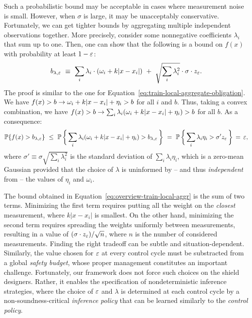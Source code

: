 \documentclass[acmsmall,screen,nonacm]{acmart}
\begin{document}
\newcommand{\OverviewAggBound}{b_{\lambda, \Eps}}

Such a probabilistic bound may be acceptable in cases where measurement noise is small. However, when $\sigma$ is large, it may be unacceptably conservative. Fortunately, we can get tighter bounds by aggregating multiple independent observations together. More precisely, consider some nonnegative coefficients $\lambda_i$ that sum up to one. Then, one can show that the following is a bound on $f(x)$ with probability at least $1 - \varepsilon$:
\begin{equation}\label{eq:overview-train-local-aggr}
  \OverviewAggBound \ \equiv \ \sum_i \lambda_i \cdot (\omega_i + k|x-x_i|) \ + \ \sqrt{\sum_i \lambda_i^2} \cdot \sigma \cdot z_\Eps.
\end{equation}
The proof is similar to the one for Equation~\ref{eq:train-local-aggregate-obligation}. We have $f(x) > b \rightarrow \omega_i + k|x-x_i| + \eta_i > b$ for all $i$ and $b$. Thus, taking a convex combination, we have $f(x) > b \rightarrow \sum_i \lambda_i (\omega_i + k|x-x_i| + \eta_i) > b$ for all $b$. As a consequence:
\begin{equation}\label{eq:overview-train-local-aggr-proof}
  \Prob\{f(x) > \OverviewAggBound \} \ \le\  \Prob\,\biggl\{  \,\sum_i \lambda_i (\omega_i + k|x-x_i| + \eta_i) > \OverviewAggBound \, \biggr\} \ = \  \Prob\,\biggl\{ \,\sum_i \lambda_i\eta_i > \sigma' z_\Eps\, \biggr\} \,=\, \Eps,
\end{equation}
where $\sigma' \!\equiv\! \sigma \sqrt{\sum_i \lambda_i^2}$ is the standard deviation of $\sum_i \lambda_i \eta_i$, which is a zero-mean Gaussian provided that the choice of $\lambda$ is uninformed by -- and thus \emph{independent} from -- the values of $\eta_i$ and $\omega_i$.

The bound obtained in Equation~\ref{eq:overview-train-local-aggr} is the sum of two terms. Minimizing the first term requires putting all the weight on the \emph{closest} measurement, where $k|x-x_i|$ is smallest. On the other hand, minimizing the second term requires spreading the weights uniformly between measurements, resulting in a value of $(\sigma \cdot z_\varepsilon) / \sqrt{n}$, where $n$ is the number of considered measurements. Finding the right tradeoff can be subtle and situation-dependent. Similarly, the value chosen for $\varepsilon$ at every control cycle must be substracted from a global \emph{safety budget}, whose proper management constitutes an important challenge. Fortunately, our framework does not force such choices on the shield designers. Rather, it enables the specification of nondeterministic inference strategies, where the choice of $\varepsilon$ and $\lambda$ is determined at each control cycle by a non-soundness-critical \emph{inference policy} that can be learned similarly to the \emph{control policy}.
\end{document}
